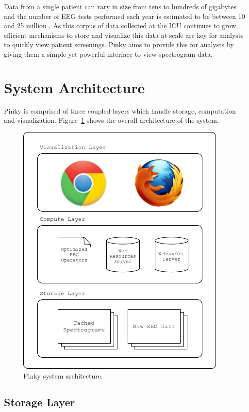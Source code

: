Data from a single patient can vary in size from tens to hundreds of gigabytes
and the number of EEG tests performed each year is estimated to be between 10
and 25 million \cite{eeg-scale}. As this corpus of data collected at the ICU
continues to grow, efficient mechanisms to store and visualize this data at
scale are key for analysts to quickly view patient screenings. Pinky aims to
provide this for analysts by giving them a simple yet powerful interface to
view spectrogram data.

\section{System Architecture}

Pinky is comprised of three coupled layers which handle storage, computation
and visualization. Figure~\ref{fig:system-architecture} shows the overall
architecture of the system.

\begin{figure}[h]
\begin{center}
\includegraphics[scale=0.75]{./img/system-architecture.png}
\caption{Pinky system architecture.}
\label{fig:system-architecture}
\end{center}
\end{figure}

\subsection{Storage Layer}

